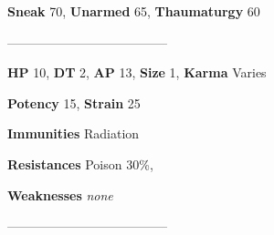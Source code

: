 \documentclass[11pt,a4paper,twocolumn]{book}
\begin{document}
\noindent
\textbf{Sneak} 70, \textbf{Unarmed} 65, \textbf{Thaumaturgy} 60 %

--------------------------------------

\noindent
\textbf{HP} 10, \textbf{DT} 2, \textbf{AP} 13, \textbf{Size} 1, \textbf{Karma} Varies

\noindent
\textbf{Potency} 15, \textbf{Strain} 25

\noindent
\textbf{Immunities} Radiation %

\noindent
\textbf{Resistances} Poison 30\%, %

\noindent
\textbf{Weaknesses} \emph{none}%

--------------------------------------	
\end{document}
